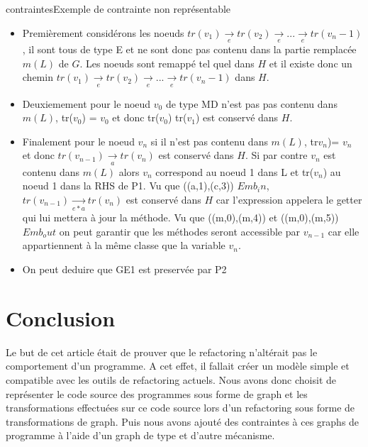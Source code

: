\documentclass[a4paper, 12pt]{article}
\begin{document}
\begin{figu}{contraintes}{Exemple de contrainte non représentable}
{\begin{enumerate}
\begin{itemize}[label=\textbullet]
      \item Premièrement considérons les noeuds $tr(v_1) \underset{e}{\rightarrow} tr(v_2) \underset{e}{\rightarrow} ... \underset{e}{\rightarrow} tr(v_n-1)$, il sont  tous de type E et ne sont donc pas contenu dans la partie remplacée $m(L)$ de $G$.
      Les noeuds sont remappé tel quel dans $H$ et il existe donc un chemin $tr(v_1) \underset{e}{\rightarrow} tr(v_2) \underset{e}{\rightarrow} ... \underset{e}{\rightarrow} tr(v_n-1)$ dans $H$.

      \item Deuxiemement pour le noeud {$v_0$} de type MD n'est pas pas contenu dans $m(L)$, tr({$v_0$}) = {$v_0$} et donc tr({$v_0$})  tr({$v_1$}) est conservé dans $H$.

      \item  Finalement pour le noeud {$v_n$} si il n'est pas contenu dans $m(L)$, tr{$v_n$})= {$v_n$} et donc $tr(v_{n-1}) \underset{a}{\rightarrow} tr(v_n)$ est conservé dans $H$.
      Si par contre {$v_n$} est contenu dans $m(L)$ alors {$v_n$} correspond au noeud 1 dans L et tr($v_n$) au noeud 1 dans la RHS de P1.
      Vu que ((a,1),(c,3)) \in $Emb_in$, $tr(v_{n-1}) \underset{e * a}{\rightarrow} tr(v_n)$ est conservé dans $H$ car l'expression appelera le getter qui lui mettera à jour la méthode.
      Vu que ((m,0),(m,4)) et ((m,0),(m,5)) \in $Emb_out$ on peut garantir que les méthodes seront accessible par $v_{n-1}$ car elle appartiennent à la même classe que la variable $v_n$.

      \item On peut deduire que GE1 est preservée par P2
    \end{itemize}

  \end{enumerate}

  \section{Conclusion}

  Le but de cet article était de prouver que le refactoring n'altérait pas le comportement d'un programme.
  A cet effet, il fallait créer un modèle simple et compatible avec les outils de refactoring actuels. Nous avons donc choisit de représenter le code source des programmes sous forme de graph
  et les transformations effectuées sur ce code source lors d'un refactoring sous forme de transformations de graph. Puis nous avons ajouté des contraintes à ces graphs de programme à l'aide d'un graph de type et d'autre mécanisme.

}
\end{figu}
\end{document}
